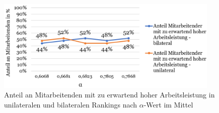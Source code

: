 \begin{figure}[H]
    \centering
	\includegraphics[width=0.95\textwidth]{gfx/verhaeltnis-a-nach-alpha.png}
	\caption[Anteil an Mitarbeitenden mit zu erwartend hoher Arbeitsleistung in unilateralen und bilateralen Rankings nach $\alpha$-Wert im Mittel]{Anteil an Mitarbeitenden mit zu erwartend hoher Arbeitsleistung in unilateralen und bilateralen Rankings nach $\alpha$-Wert im Mittel}
	\label{fig:ergebnisse:abb13}
\end{figure}



